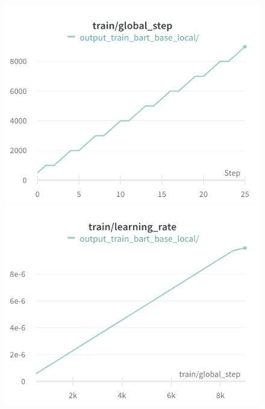 \documentclass{article}
\begin{document}
\begin{figure}[!htb]
\includegraphics[width=\linewidth]{charts/Section-8-Panel-2-utzp1vfip}
\caption{}
\endminipage\hfill
{}
\includegraphics[width=\linewidth]{charts/Section-8-Panel-3-g06yu99wh}
\caption{}
\endminipage
\end{figure}

\nocite{*}


\end{document}
